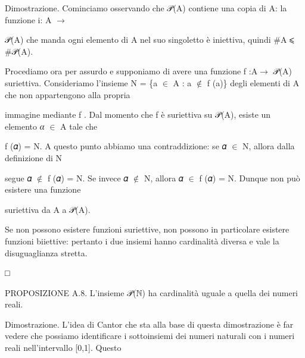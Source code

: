 \documentclass[a4paper,portrait,12pt]{article}
\begin{document}
\begin{flushleft}
Dimostrazione. Cominciamo osservando che 𝒫(A) contiene una copia di A: la funzione i: A $\rightarrow$
\end{flushleft}


\begin{flushleft}
𝒫(A) che manda ogni elemento di A nel suo singoletto \`{e} iniettiva, quindi \#A ⩽ \#𝒫(A).
\end{flushleft}


\begin{flushleft}
Procediamo ora per assurdo e supponiamo di avere una funzione f :A$\rightarrow$ 𝒫(A) suriettiva. Consideriamo l'insieme N = \{a $\in$ A : a $\notin$ f (a)\} degli elementi di A che non appartengono alla propria
\end{flushleft}


\begin{flushleft}
immagine mediante f . Dal momento che f \`{e} suriettiva su 𝒫(A), esiste un elemento 𝛼 $\in$ A tale che
\end{flushleft}


\begin{flushleft}
f (𝛼) = N. A questo punto abbiamo una contraddizione: se 𝛼 $\in$ N, allora dalla definizione di N
\end{flushleft}


\begin{flushleft}
segue 𝛼 $\notin$ f (𝛼) = N. Se invece 𝛼 $\notin$ N, allora 𝛼 $\in$ f (𝛼) = N. Dunque non pu\`{o} esistere una funzione
\end{flushleft}


\begin{flushleft}
suriettiva da A a 𝒫(A).
\end{flushleft}


\begin{flushleft}
Se non possono esistere funzioni suriettive, non possono in particolare esistere funzioni biiettive: pertanto i due insiemi hanno cardinalit\`{a} diversa e vale la disuguaglianza stretta.
\end{flushleft}


□


\begin{flushleft}
PROPOSIZIONE A.8. L'insieme 𝒫(ℕ) ha cardinalit\`{a} uguale a quella dei numeri reali.
\end{flushleft}


\begin{flushleft}
Dimostrazione. L'idea di Cantor che sta alla base di questa dimostrazione \`{e} far vedere che possiamo identificare i sottoinsiemi dei numeri naturali con i numeri reali nell'intervallo [0,1]. Questo
\end{flushleft}
\end{document}
